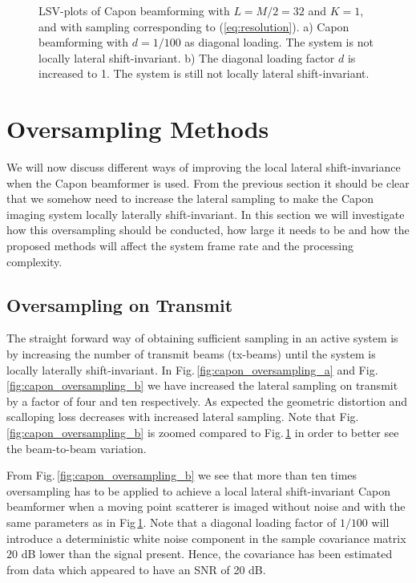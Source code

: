 \documentclass[journal]{IEEEtran}
\newcommand{\img}{img/}
\begin{document}
\begin{figure}[!t]
\centerline{
}
\caption{LSV-plots of Capon beamforming with $L=M/2=32$ and $K=1$, and with sampling corresponding to (\ref{eq:resolution}). a) Capon beamforming with $d=1/100$ as diagonal loading. The system is not locally lateral shift-invariant. b) The diagonal loading factor $d$ is increased to 1. The system is still not locally lateral shift-invariant.}
\label{fig:capon}
\end{figure}

\section{Oversampling Methods}\label{sec:methods}
We will now discuss different ways of improving the local lateral shift-invariance when the Capon beamformer is used. From the previous section it should be clear that we somehow need to increase the lateral sampling to make the Capon imaging system locally laterally shift-invariant. In this section we will investigate how this oversampling should be conducted, how large it needs to be and how the proposed methods will affect the system frame rate and the processing complexity.

\subsection{Oversampling on Transmit}
The straight forward way of obtaining sufficient sampling in an active system is by increasing the number of transmit beams (tx-beams) until the system is locally laterally shift-invariant. In Fig.\,\ref{fig:capon_oversampling_a} and Fig.\,\ref{fig:capon_oversampling_b} we have increased the lateral sampling on transmit by a factor of four and ten respectively. As expected the geometric distortion and scalloping loss decreases with increased lateral sampling. Note that Fig.\,\ref{fig:capon_oversampling_b} is zoomed compared to Fig.\,\ref{fig:capon} in order to better see the beam-to-beam variation.

From Fig.\,\ref{fig:capon_oversampling_b} we see that more than ten times oversampling has to be applied to achieve a local lateral shift-invariant Capon beamformer when a moving point scatterer is imaged without noise and with the same parameters as in Fig\,\ref{fig:capon}. %
Note that a diagonal loading factor of $1/100$ will introduce a deterministic white noise component in the sample covariance matrix $20$ dB lower than the signal present. Hence, the covariance has been estimated from data which appeared to have an SNR of 20 dB.
\end{document}
